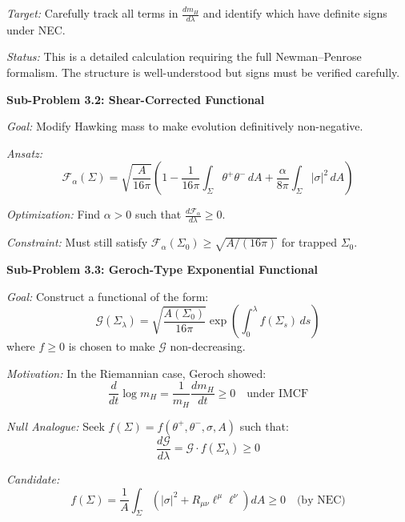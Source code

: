 \textit{Target:} Carefully track all terms in $\frac{dm_H}{d\lambda}$ and identify which have definite signs under NEC.

\textit{Status:} This is a detailed calculation requiring the full Newman--Penrose formalism. The structure is well-understood but signs must be verified carefully.

\textbf{Sub-Problem 3.2: Shear-Corrected Functional}

\textit{Goal:} Modify Hawking mass to make evolution definitively non-negative.

\textit{Ansatz:}
\begin{equation}
    \mathcal{F}_\alpha(\Sigma) = \sqrt{\frac{A}{16\pi}}\left(1 - \frac{1}{16\pi}\int_\Sigma \theta^+\theta^- \, dA + \frac{\alpha}{8\pi}\int_\Sigma |\sigma|^2 \, dA\right)
\end{equation}

\textit{Optimization:} Find $\alpha > 0$ such that $\frac{d\mathcal{F}_\alpha}{d\lambda} \geq 0$.

\textit{Constraint:} Must still satisfy $\mathcal{F}_\alpha(\Sigma_0) \geq \sqrt{A/(16\pi)}$ for trapped $\Sigma_0$.

\textbf{Sub-Problem 3.3: Geroch-Type Exponential Functional}

\textit{Goal:} Construct a functional of the form:
\begin{equation}
    \mathcal{G}(\Sigma_\lambda) = \sqrt{\frac{A(\Sigma_0)}{16\pi}} \exp\left(\int_0^\lambda f(\Sigma_s) \, ds\right)
\end{equation}
where $f \geq 0$ is chosen to make $\mathcal{G}$ non-decreasing.

\textit{Motivation:} In the Riemannian case, Geroch showed:
\begin{equation}
    \frac{d}{dt}\log m_H = \frac{1}{m_H}\frac{dm_H}{dt} \geq 0 \quad \text{under IMCF}
\end{equation}

\textit{Null Analogue:} Seek $f(\Sigma) = f(\theta^+, \theta^-, \sigma, A)$ such that:
\begin{equation}
    \frac{d\mathcal{G}}{d\lambda} = \mathcal{G} \cdot f(\Sigma_\lambda) \geq 0
\end{equation}

\textit{Candidate:}
\begin{equation}
    f(\Sigma) = \frac{1}{A}\int_\Sigma \left(|\sigma|^2 + R_{\mu\nu}\ell^\mu\ell^\nu\right) dA \geq 0 \quad \text{(by NEC)}
\end{equation}

